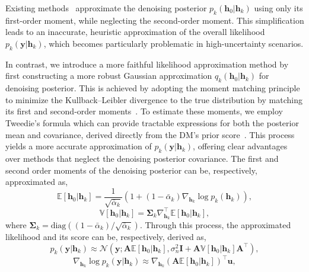 \documentclass[lettersize,journal]{IEEEtran}
\begin{document}
Existing methods~\cite{arvinteMIMOChannelEstimation2023,zhouGenerativeDiffusionModels2025} approximate the denoising posterior $p_{k}(\mathbf{h}_{0}|\mathbf{h}_{k})$ using only its first-order moment, while neglecting the second-order moment. This simplification leads to an inaccurate, heuristic approximation of the overall likelihood $p_{k}(\mathbf{y}|\mathbf{h}_{k})$, which becomes particularly problematic in high-uncertainty scenarios.

In contrast, we introduce a more faithful likelihood approximation method by first constructing a more robust Gaussian approximation $q_{k}(\mathbf{h}_{0}|\mathbf{h}_{k})$ for denoising posterior. This is achieved by adopting the moment matching principle to minimize the Kullback–Leibler divergence to the true distribution by matching its first and second-order moments~\cite{bishopPatternRecognitionMachine2006}. To estimate these moments, we employ Tweedie's formula which can provide tractable expressions for both the posterior mean and covariance, derived directly from the DM's prior score~\cite{efronTweediesFormulaSelection2011}. This process yields a more accurate approximation of $p_{k}(\mathbf{y}|\mathbf{h}_{k})$, offering clear advantages over methods that neglect the denoising posterior covariance. The first and second order moments of the denoising posterior can be, respectively, approximated as,
\begin{equation}
\label{eq:first_moment}
\mathbb{E}[\mathbf{h}_{0}|\mathbf{h}_{k}] = \frac{1}{\sqrt{ \bar{\alpha}_{k} }}(1+(1-\bar{\alpha}_{k})\nabla_{\mathbf{h}_{k}}\log p_{k}(\mathbf{h}_{k})),
\end{equation}
\begin{equation}
\label{eq:second_moment}
\mathbb{V}[\mathbf{h}_{0}|\mathbf{h}_{k}] = \boldsymbol{\Sigma}_{k}\nabla_{\mathbf{h}_{k}}^{\top}\mathbb{E}[\mathbf{h}_{0}|\mathbf{h}_{k}],
\end{equation}
where $\boldsymbol{\Sigma}_{k} = \text{diag}((1-\bar{\alpha}_{k}) / \sqrt{ \bar{\alpha}_{k} })$. Through this process, the approximated likelihood and its score can be, respectively, derived as,
\begin{equation}
\label{eq:likelihood_approx}
p_{k}(\mathbf{y}|\mathbf{h}_{k}) \approx \mathcal{N}(\mathbf{y}; \mathbf{A}\mathbb{E}[\mathbf{h}_{0}|\mathbf{h}_{k}], \sigma_{n}^{2}\mathbf{I}+\mathbf{A}\mathbb{V}[\mathbf{h}_{0}|\mathbf{h}_{k}]\mathbf{A}^{\top}),
\end{equation}
\begin{equation}
\label{eq:likelihood_score_approx}
\nabla_{\mathbf{h}_{k}}\log p_{k}(\mathbf{y}|\mathbf{h}_{k}) \approx \nabla_{\mathbf{h}_{k}} (\mathbf{A}\mathbb{E}[\mathbf{h}_{0}|\mathbf{h}_{k}])^{\top}\mathbf{u},
\end{equation}
\end{document}
